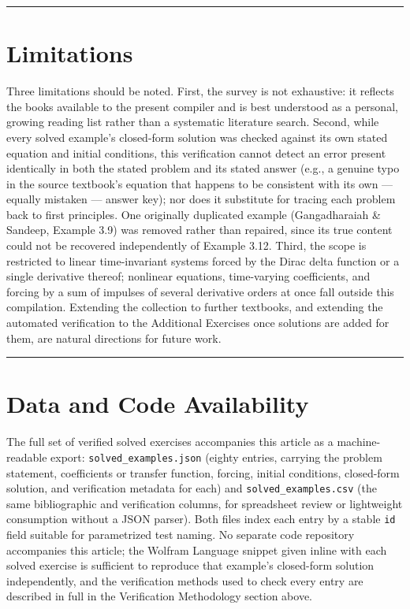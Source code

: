 \documentclass[
  11pt,
]{article}
\begin{document}
\begin{center}\rule{0.5\linewidth}{0.5pt}\end{center}

\hypertarget{limitations}{%
\section{Limitations}\label{limitations}}

Three limitations should be noted. First, the survey is not exhaustive:
it reflects the books available to the present compiler and is best
understood as a personal, growing reading list rather than a systematic
literature search. Second, while every solved example's closed-form
solution was checked against its own stated equation and initial
conditions, this verification cannot detect an error present identically
in both the stated problem and its stated answer (e.g., a genuine typo
in the source textbook's equation that happens to be consistent with its
own --- equally mistaken --- answer key); nor does it substitute for
tracing each problem back to first principles. One originally duplicated
example (Gangadharaiah \& Sandeep, Example 3.9) was removed rather than
repaired, since its true content could not be recovered independently of
Example 3.12. Third, the scope is restricted to linear time-invariant
systems forced by the Dirac delta function or a single derivative
thereof; nonlinear equations, time-varying coefficients, and forcing by
a sum of impulses of several derivative orders at once fall outside this
compilation. Extending the collection to further textbooks, and
extending the automated verification to the Additional Exercises once
solutions are added for them, are natural directions for future work.

\begin{center}\rule{0.5\linewidth}{0.5pt}\end{center}

\hypertarget{data-and-code-availability}{%
\section{Data and Code Availability}\label{data-and-code-availability}}

The full set of verified solved exercises accompanies this article as a
machine-readable export: \texttt{solved\_examples.json} (eighty entries,
carrying the problem statement, coefficients or transfer function,
forcing, initial conditions, closed-form solution, and verification
metadata for each) and \texttt{solved\_examples.csv} (the same
bibliographic and verification columns, for spreadsheet review or
lightweight consumption without a JSON parser). Both files index each
entry by a stable \texttt{id} field suitable for parametrized test
naming. No separate code repository accompanies this article; the
Wolfram Language snippet given inline with each solved exercise is
sufficient to reproduce that example's closed-form solution
independently, and the verification methods used to check every entry
are described in full in the Verification Methodology section above.
\end{document}
